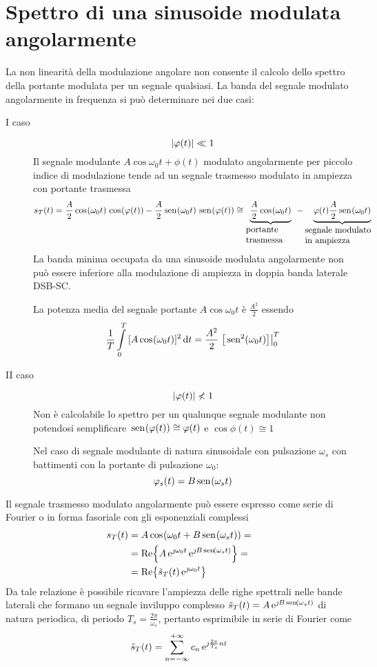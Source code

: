\section{Spettro di una sinusoide modulata angolarmente}
La non linearità della modulazione angolare non consente il calcolo dello spettro della portante modulata per un segnale qualsiasi. La banda del segnale modulato angolarmente in frequenza si può determinare nei due casi:
\begin{description}
\item[I caso] \[\abs{\phi(t)}\ll 1\]
Il segnale modulante $A\cos{\omega_0 t+\phi(t)}$ modulato angolarmente per piccolo indice di modulazione tende ad un segnale trasmesso modulato in ampiezza con portante trasmessa
\[s_T(t)=\frac{A}{2}\cos{\omega_0 t}\cos{\phi(t)}-\frac{A}{2}\sen{\omega_0 t}\sen{\phi(t)}\cong \underbrace{\frac{A}{2}\cos{\omega_0 t}}_{\parbox[c]{2cm}{portante\\trasmessa}}-\underbrace{\phi(t)\frac{A}{2}\sen{\omega_0 t}}_{\parbox[c]{3cm}{segnale modulato\\in ampiezza}}\]
La banda minima occupata da una sinusoide modulata angolarmente non può essere inferiore alla modulazione di ampiezza in doppia banda laterale \ac{DSB-SC}.

La potenza media del segnale portante $A\cos{\omega_0 t}$ è $\frac{A^2}{2}$ essendo \[\frac{1}{T}\intd{0}{T}{[A\cos{\omega_0 t}]^2}{t}=\frac{A^2}{2}\bound{0}{T}{\sen[2]{\omega_0 t}}\]

\item[II caso] \[\abs{\phi(t)}\nless 1\]
Non è calcolabile lo spettro per un qualunque segnale modulante non potendosi semplificare $\sen{\phi(t)}\cong\phi(t)$ e $\cos{\phi(t)}\cong 1$

Nel caso di segnale modulante di natura sinusoidale con pulsazione $\omega_s$ con battimenti con la portante di pulsazione $\omega_0$:
\[\phi_s(t)=B\sen{\omega_s t}\]
\end{description}

Il segnale trasmesso modulato angolarmente può essere espresso come serie di Fourier o in forma fasoriale con gli esponenziali complessi
\begin{equation}\begin{split}
s_T(t)&=A\cos{\omega_0 t+B\sen{\omega_s t}}=\\
&=\Re{A\e{\jmath\omega_0 t}\e{\jmath B\sen{\omega_s t}}}=\\
&=\Re{\tilde{s}_T(t)\e{\jmath\omega_0 t}}
\end{split}\end{equation}
Da tale relazione è possibile ricavare l'ampiezza delle righe spettrali nelle bande laterali che formano un segnale inviluppo complesso $\tilde{s}_T(t)=A\e{\jmath B\sen{\omega_s t}}$ di natura periodica, di periodo $T_s=\frac{2\pi}{\omega_s}$, pertanto esprimibile in serie di Fourier come
\begin{equation}
\tilde{s}_T(t)=\sum_{n=-\infty}^{+\infty}{c_n\e{\jmath \frac{2\pi}{T_s}n t}}
\end{equation}

